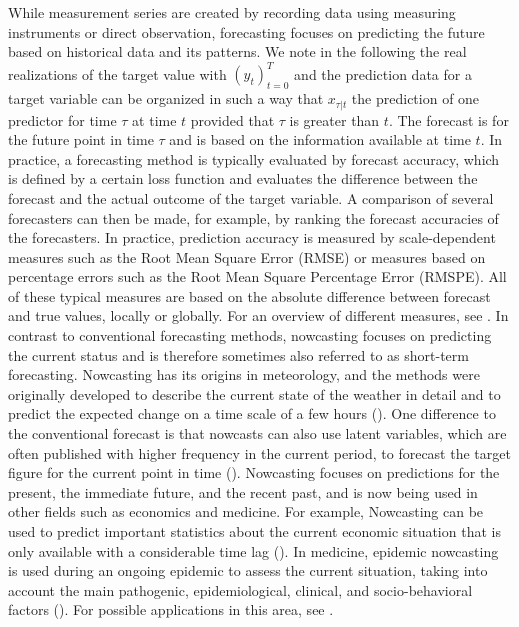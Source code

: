 While measurement series are created by recording data using measuring instruments or direct observation, forecasting focuses on predicting the future based on historical data and its patterns. We note in the following the real realizations of the target value with $(y_t)^T_{t=0}$ and the prediction data for a target variable can be organized in such a way that $x_{\tau|t}$ the prediction of one predictor for time $\tau$ at time $t$ provided that $\tau$ is greater than $t$. The forecast is for the future point in time $\tau$ and is based on the information available at time $t$. 
In practice, a forecasting method is typically evaluated by forecast accuracy, which is defined by a certain loss function and evaluates the difference between the forecast and the actual outcome of the target variable.
A comparison of several forecasters can then be made, for example, by ranking the forecast accuracies of the forecasters.
In practice, prediction accuracy is measured by scale-dependent measures such as the Root Mean Square Error (RMSE) or measures based on percentage errors such as the Root Mean Square Percentage Error (RMSPE). All of these typical measures are based on the absolute difference between forecast and true values, locally or globally. For an overview of different measures, see \cite{hyndman2006another}. 
In contrast to conventional forecasting methods, nowcasting focuses on predicting the current status and is therefore sometimes also referred to as short-term forecasting. Nowcasting has its origins in meteorology, and the methods were originally developed to describe the current state of the weather in detail and to predict the expected change on a time scale of a few hours (\cite{browning1989nowcasting,schmid2019nowcasting}). One difference to the conventional forecast is that nowcasts can also use latent variables, which are often published with higher frequency in the current period, to forecast the target figure for the current point in time (\cite{castle2017forecasting}). 
Nowcasting focuses on predictions for the present, the immediate future, and the recent past, and is now being used in other fields such as economics and medicine. For example, Nowcasting can be used to predict important statistics about the current economic situation that is only available with a considerable time lag (\cite{banbura2013now, giannone2006nowcasting,fornaro2020nowcasting,bok2018macroeconomic}). In medicine, epidemic nowcasting is used during an ongoing epidemic to assess the current situation, taking into account the main pathogenic, epidemiological, clinical, and socio-behavioral factors (\cite{wu2021nowcasting}). For possible applications in this area, see \cite{johansson2014nowcasting,gunther2021nowcasting,birrell2021real}.
